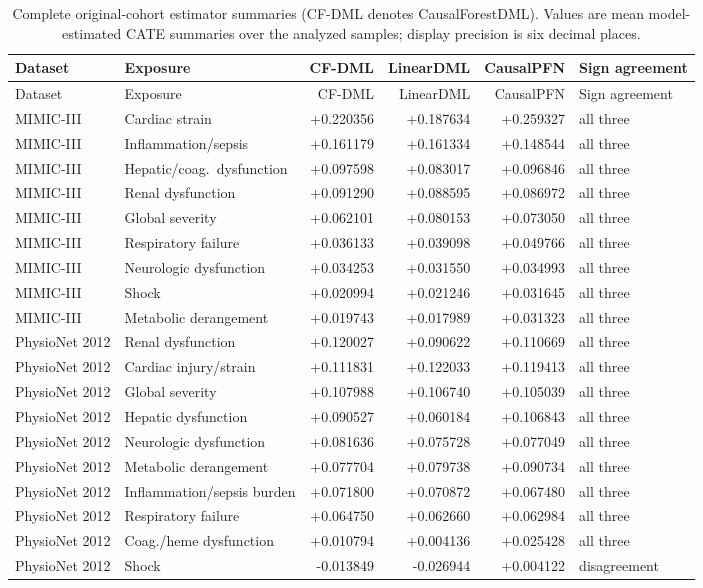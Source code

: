 \documentclass[letterpaper,10pt]{article}
\begin{document}
\begin{longtable}{@{}p{0.84in}p{1.42in}rrrp{0.68in}@{}}
\caption{Complete original-cohort estimator summaries (CF-DML denotes
CausalForestDML). Values are mean model-estimated CATE summaries over the
analyzed samples; display precision is six decimal places.}
\label{tab:supp-original-cate}\\
\toprule
Dataset & Exposure & CF-DML & LinearDML & CausalPFN & Sign agreement\\
\midrule
\endfirsthead
\toprule
Dataset & Exposure & CF-DML & LinearDML & CausalPFN & Sign agreement\\
\midrule
\endhead
MIMIC-III & Cardiac strain
& +0.220356 & +0.187634 & +0.259327 & all three\\
MIMIC-III & Inflammation/sepsis
& +0.161179 & +0.161334 & +0.148544 & all three\\
MIMIC-III & Hepatic/coag.\ dysfunction
& +0.097598 & +0.083017 & +0.096846 & all three\\
MIMIC-III & Renal dysfunction
& +0.091290 & +0.088595 & +0.086972 & all three\\
MIMIC-III & Global severity
& +0.062101 & +0.080153 & +0.073050 & all three\\
MIMIC-III & Respiratory failure
& +0.036133 & +0.039098 & +0.049766 & all three\\
MIMIC-III & Neurologic dysfunction
& +0.034253 & +0.031550 & +0.034993 & all three\\
MIMIC-III & Shock
& +0.020994 & +0.021246 & +0.031645 & all three\\
MIMIC-III & Metabolic derangement
& +0.019743 & +0.017989 & +0.031323 & all three\\
\addlinespace
PhysioNet 2012 & Renal dysfunction
& +0.120027 & +0.090622 & +0.110669 & all three\\
PhysioNet 2012 & Cardiac injury/strain
& +0.111831 & +0.122033 & +0.119413 & all three\\
PhysioNet 2012 & Global severity
& +0.107988 & +0.106740 & +0.105039 & all three\\
PhysioNet 2012 & Hepatic dysfunction
& +0.090527 & +0.060184 & +0.106843 & all three\\
PhysioNet 2012 & Neurologic dysfunction
& +0.081636 & +0.075728 & +0.077049 & all three\\
PhysioNet 2012 & Metabolic derangement
& +0.077704 & +0.079738 & +0.090734 & all three\\
PhysioNet 2012 & Inflammation/sepsis burden
& +0.071800 & +0.070872 & +0.067480 & all three\\
PhysioNet 2012 & Respiratory failure
& +0.064750 & +0.062660 & +0.062984 & all three\\
PhysioNet 2012 & Coag./heme dysfunction
& +0.010794 & +0.004136 & +0.025428 & all three\\
PhysioNet 2012 & Shock
& -0.013849 & -0.026944 & +0.004122 & disagreement\\
\bottomrule
\end{longtable}
\end{document}
